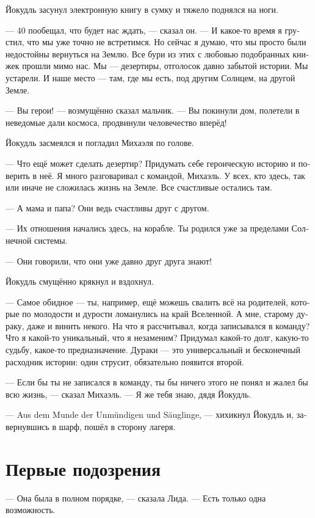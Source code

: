 \documentclass[a4paper,10pt,fleqn]{book}\usepackage{polyglossia}\setdefaultlanguage[babelshorthands=true]{russian}\setotherlanguage{english}\defaultfontfeatures{Ligatures=TeX,Mapping=tex-text}\usepackage{xcolor}\newcommand{\ml}[3]{#2}
\begin{document}
Йокудль засунул электронную книгу в сумку и тяжело поднялся на ноги.

--- 40 пообещал, что будет нас ждать, --- сказал он.
--- И какое-то время я грустил, что мы уже точно не встретимся.
Но сейчас я думаю, что мы просто были недостойны вернуться на Землю.
Все бури из этих с любовью подобранных книжек прошли мимо нас.
Мы --- дезертиры, отголосок давно забытой истории.
Мы устарели.
И наше место --- там, где мы есть, под другим Солнцем, на другой Земле.

--- Вы герои! --- возмущённо сказал мальчик.
--- Вы покинули дом, полетели в неведомые дали космоса, продвинули человечество вперёд!

Йокудль засмеялся и погладил Михаэля по голове.

--- Что ещё может сделать дезертир?
Придумать себе героическую историю и поверить в неё.
Я много разговаривал с командой, Михаэль.
У всех, кто здесь, так или иначе не сложилась жизнь на Земле.
Все счастливые остались там.

--- А мама и папа?
Они ведь счастливы друг с другом.

--- Их отношения начались здесь, на корабле.
Ты родился уже за пределами Солнечной системы.

--- Они говорили, что они уже давно друг друга знают!

Йокудль смущённо крякнул и вздохнул.

--- Самое обидное --- ты, например, ещё можешь свалить всё на родителей, которые по молодости и дурости ломанулись на край Вселенной.
А мне, старому дураку, даже и винить некого.
На что я рассчитывал, когда записывался в команду?
Что я какой-то уникальный, что я незаменим?
Придумал какой-то долг, какую-то судьбу, какое-то предназначение.
Дураки --- это универсальный и бесконечный расходник истории: один струсит, обязательно появится второй.

--- Если бы ты не записался в команду, ты бы ничего этого не понял и жалел бы всю жизнь, --- сказал Михаэль.
--- Я же тебя знаю, дядя Йокудль.

--- Aus dem Munde der Unmündigen und Säuglinge, --- хихикнул Йокудль и, завернувшись в шарф, пошёл в сторону лагеря.

\section{Первые подозрения}

--- Она была в полном порядке, --- сказала Лида.
--- Есть только одна возможность.
\end{document}
